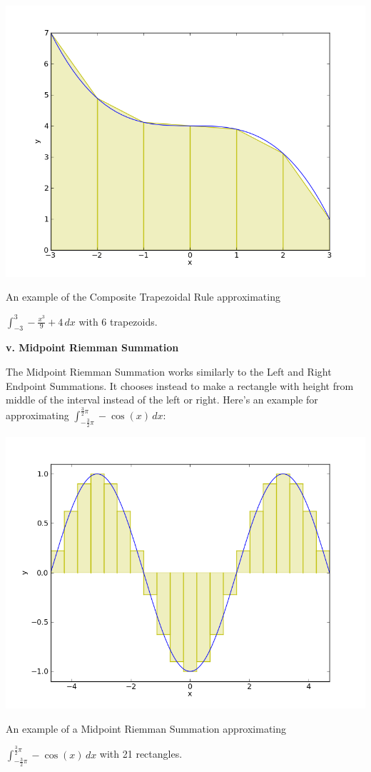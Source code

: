 \documentclass[12pt]{article}
\newcommand{\newLine}{\vspace{5mm}}
\newcommand{\nextsubsection}[1]{\newLine \noindent \large \textbf{#1} \normalsize}
\newcommand{\integral}[3]{\text{$\int^{#2}_{#1} #3\,dx$}}
\begin{document}
\begin{center} \includegraphics[scale = 0.5]{cubicTrapezoidal.png} 

\small An example of the Composite Trapezoidal Rule approximating 

$\integral{-3}{3}{-\frac{x^3}{9}+4}$ with 6 trapezoids.\normalsize
\end{center}

\nextsubsection{v. Midpoint Riemman Summation}

\newLine The Midpoint Riemman Summation works similarly to the Left and Right Endpoint Summations. It chooses instead to make a rectangle with height from middle of the interval instead of the left or right. Here's an example for approximating $\integral{-\frac{3}{2}\pi}{\frac{3}{2}\pi}{-\cos(x)}$:

\begin{center} \includegraphics[scale = 0.5]{cosMidpointRiemman.png} 

\small An example of a Midpoint Riemman Summation approximating 

$\integral{-\frac{3}{2}\pi}{\frac{3}{2}\pi}{-\cos(x)}$ with 21 rectangles.\normalsize
\end{center}
\end{document}
